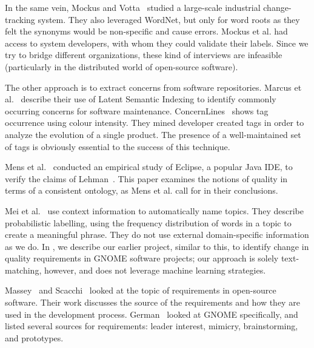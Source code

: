 \documentclass[]{sig-alternate}
\begin{document}
In the same vein, Mockus and Votta~\cite{Mockus00} studied a large-scale industrial change-tracking system. 
They also leveraged WordNet, but only for word roots as they felt the synonyms would be non-specific and cause errors. 
Mockus et al. had access to system developers, with whom they could validate their labels. 
Since we try to bridge different organizations, these kind of interviews are infeasible (particularly in the distributed world of open-source software).

The other approach is to extract concerns from software repositories.
Marcus et al.~\cite{marcus04wcre} describe their use of Latent Semantic Indexing to identify commonly occurring concerns for software maintenance. 
ConcernLines~\cite{treude09cl} shows tag occurrence using colour intensity. 
They mined 
developer created tags 
in order to analyze the evolution of a single product.
The presence of a well-maintained set of tags is obviously essential to the success of this technique.

Mens et al.~\cite{mens08icsm} conducted an empirical study of Eclipse, a popular Java IDE, to verify the claims of Lehman~\cite{lehman97sms}.
This paper examines the notions of quality in terms of a consistent ontology, as Mens
et al. call for in their conclusions.

Mei et al.~\cite{Mei2007} use context information to automatically name topics. 
They describe probabilistic labelling, using the frequency distribution of words in a topic to create a meaningful phrase. 
They do not use external domain-specific information as we do.
In \cite{ernst10refsq}, we describe our earlier project, similar to this, to identify change in quality requirements in GNOME software projects; our approach is solely text-matching, however, and does not leverage machine learning strategies.

Massey~\cite{massey02icse} and Scacchi~\cite{scacchi05b} looked at the topic of requirements in open-source software. 
Their work discusses the source of the requirements and how they are used in the development process. German~\cite{german03gnome} looked at GNOME specifically, and listed several sources for requirements: leader interest, mimicry, brainstorming, and prototypes. 
\end{document}

